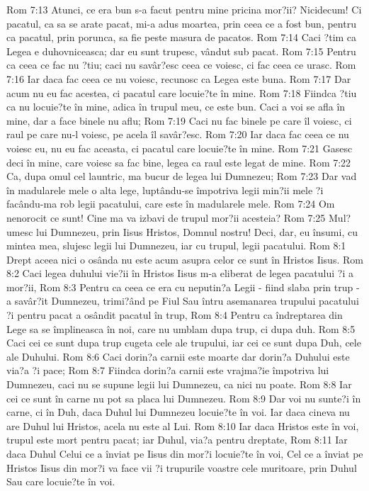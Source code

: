 Rom 7:13  Atunci, ce era bun s-a facut pentru mine pricina mor?ii? Nicidecum! Ci pacatul, ca sa se arate pacat, mi-a adus moartea, prin ceea ce a fost bun, pentru ca pacatul, prin porunca, sa fie peste masura de pacatos.
Rom 7:14  Caci ?tim ca Legea e duhovniceasca; dar eu sunt trupesc, vândut sub pacat.
Rom 7:15  Pentru ca ceea ce fac nu ?tiu; caci nu savâr?esc ceea ce voiesc, ci fac ceea ce urasc.
Rom 7:16  Iar daca fac ceea ce nu voiesc, recunosc ca Legea este buna.
Rom 7:17  Dar acum nu eu fac acestea, ci pacatul care locuie?te în mine.
Rom 7:18  Fiindca ?tiu ca nu locuie?te în mine, adica în trupul meu, ce este bun. Caci a voi se afla în mine, dar a face binele nu aflu;
Rom 7:19  Caci nu fac binele pe care îl voiesc, ci raul pe care nu-l voiesc, pe acela îl savâr?esc.
Rom 7:20  Iar daca fac ceea ce nu voiesc eu, nu eu fac aceasta, ci pacatul care locuie?te în mine.
Rom 7:21  Gasesc deci în mine, care voiesc sa fac bine, legea ca raul este legat de mine.
Rom 7:22  Ca, dupa omul cel launtric, ma bucur de legea lui Dumnezeu;
Rom 7:23  Dar vad în madularele mele o alta lege, luptându-se împotriva legii min?ii mele ?i facându-ma rob legii pacatului, care este în madularele mele.
Rom 7:24  Om nenorocit ce sunt! Cine ma va izbavi de trupul mor?ii acesteia?
Rom 7:25  Mul?umesc lui Dumnezeu, prin Iisus Hristos, Domnul nostru! Deci, dar, eu însumi, cu mintea mea, slujesc legii lui Dumnezeu, iar cu trupul, legii pacatului.
Rom 8:1  Drept aceea nici o osânda nu este acum asupra celor ce sunt în Hristos Iisus.
Rom 8:2  Caci legea duhului vie?ii în Hristos Iisus m-a eliberat de legea pacatului ?i a mor?ii,
Rom 8:3  Pentru ca ceea ce era cu neputin?a Legii - fiind slaba prin trup - a savâr?it Dumnezeu, trimi?ând pe Fiul Sau întru asemanarea trupului pacatului ?i pentru pacat a osândit pacatul în trup,
Rom 8:4  Pentru ca îndreptarea din Lege sa se împlineasca în noi, care nu umblam dupa trup, ci dupa duh.
Rom 8:5  Caci cei ce sunt dupa trup cugeta cele ale trupului, iar cei ce sunt dupa Duh, cele ale Duhului.
Rom 8:6  Caci dorin?a carnii este moarte dar dorin?a Duhului este via?a ?i pace;
Rom 8:7  Fiindca dorin?a carnii este vrajma?ie împotriva lui Dumnezeu, caci nu se supune legii lui Dumnezeu, ca nici nu poate.
Rom 8:8  Iar cei ce sunt în carne nu pot sa placa lui Dumnezeu.
Rom 8:9  Dar voi nu sunte?i în carne, ci în Duh, daca Duhul lui Dumnezeu locuie?te în voi. Iar daca cineva nu are Duhul lui Hristos, acela nu este al Lui.
Rom 8:10  Iar daca Hristos este în voi, trupul este mort pentru pacat; iar Duhul, via?a pentru dreptate,
Rom 8:11  Iar daca Duhul Celui ce a înviat pe Iisus din mor?i locuie?te în voi, Cel ce a înviat pe Hristos Iisus din mor?i va face vii ?i trupurile voastre cele muritoare, prin Duhul Sau care locuie?te în voi.

